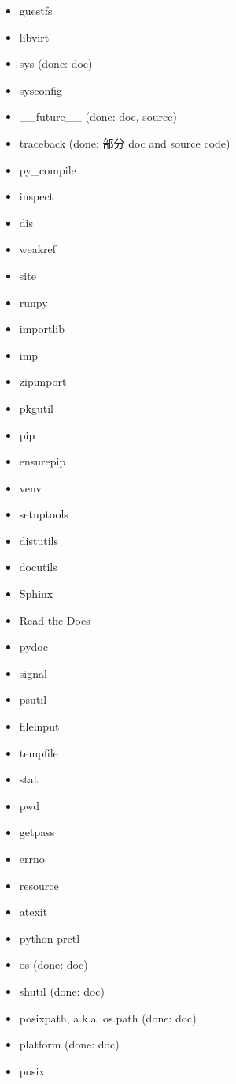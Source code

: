 \documentclass{article}
\begin{document}
\begin{enumerate}
\begin{itemize}
            \item guestfs
            \item libvirt

            \item sys (done: doc)
            \item sysconfig
            \item __future__ (done: doc, source)
            \item traceback (done: 部分 doc and source code)
            \item py_compile
            \item inspect
            \item dis
            \item weakref
            \item site
            \item runpy
            \item importlib
            \item imp
            \item zipimport
            \item pkgutil
            \item pip
            \item ensurepip
            \item venv
            \item setuptools
            \item distutils

            \item docutils
            \item Sphinx
            \item Read the Docs
            \item pydoc

            \item signal
            \item psutil
            \item fileinput
            \item tempfile
            \item stat
            \item pwd
            \item getpass
            \item errno
            \item resource
            \item atexit
            \item python-prctl
            \item os (done: doc)
            \item shutil (done: doc)
            \item posixpath, a.k.a. os.path (done: doc)
            \item platform (done: doc)
            \item posix


\end{itemize}
\end{enumerate}
\end{document}

